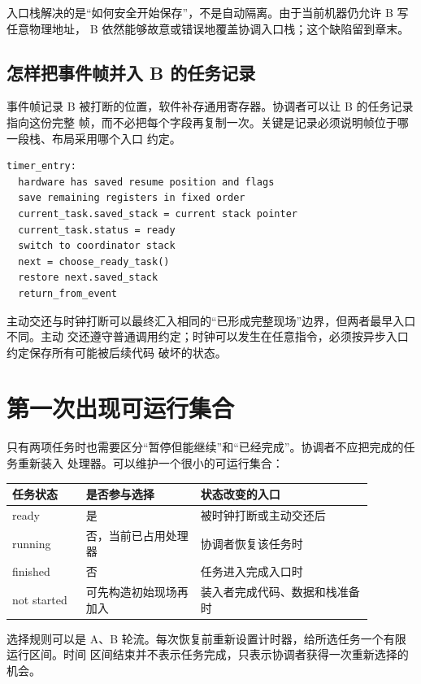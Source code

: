 入口栈解决的是“如何安全开始保存”，不是自动隔离。由于当前机器仍允许 B 写任意物理地址，
B 依然能够故意或错误地覆盖协调入口栈；这个缺陷留到章末。

\subsection{怎样把事件帧并入 B 的任务记录}

事件帧记录 B 被打断的位置，软件补存通用寄存器。协调者可以让 B 的任务记录指向这份完整
帧，而不必把每个字段再复制一次。关键是记录必须说明帧位于哪一段栈、布局采用哪个入口
约定。

\begin{lstlisting}
timer_entry:
  hardware has saved resume position and flags
  save remaining registers in fixed order
  current_task.saved_stack = current stack pointer
  current_task.status = ready
  switch to coordinator stack
  next = choose_ready_task()
  restore next.saved_stack
  return_from_event
\end{lstlisting}

主动交还与时钟打断可以最终汇入相同的“已形成完整现场”边界，但两者最早入口不同。主动
交还遵守普通调用约定；时钟可以发生在任意指令，必须按异步入口约定保存所有可能被后续代码
破坏的状态。

\section{第一次出现可运行集合}

只有两项任务时也需要区分“暂停但能继续”和“已经完成”。协调者不应把完成的任务重新装入
处理器。可以维护一个很小的可运行集合：

\begin{longtable}{|L{0.18\linewidth}|L{0.28\linewidth}|L{0.42\linewidth}|}
\hline
{}
任务状态 & 是否参与选择 & 状态改变的入口 \\ \hline
ready & 是 & 被时钟打断或主动交还后 \\ \hline
running & 否，当前已占用处理器 & 协调者恢复该任务时 \\ \hline
finished & 否 & 任务进入完成入口时 \\ \hline
not started & 可先构造初始现场再加入 & 装入者完成代码、数据和栈准备时 \\ \hline
\end{longtable}

选择规则可以是 A、B 轮流。每次恢复前重新设置计时器，给所选任务一个有限运行区间。时间
区间结束并不表示任务完成，只表示协调者获得一次重新选择的机会。

